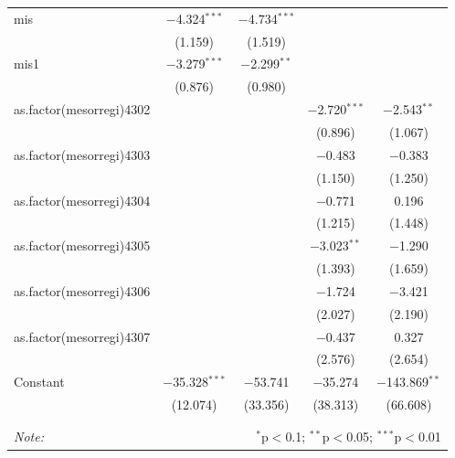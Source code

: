 \documentclass[
  a4paper,
]{article}
\begin{document}
\begin{center}
{\begin{tabular}{@{\extracolsep{3pt}}lcccc}
  mis & $-$4.324$^{***}$ & $-$4.734$^{***}$ &  &  \\ 
  & (1.159) & (1.519) &  &  \\ 
  mis1 & $-$3.279$^{***}$ & $-$2.299$^{**}$ &  &  \\ 
  & (0.876) & (0.980) &  &  \\ 
  as.factor(mesorregi)4302 &  &  & $-$2.720$^{***}$ & $-$2.543$^{**}$ \\ 
  &  &  & (0.896) & (1.067) \\ 
  as.factor(mesorregi)4303 &  &  & $-$0.483 & $-$0.383 \\ 
  &  &  & (1.150) & (1.250) \\ 
  as.factor(mesorregi)4304 &  &  & $-$0.771 & 0.196 \\ 
  &  &  & (1.215) & (1.448) \\ 
  as.factor(mesorregi)4305 &  &  & $-$3.023$^{**}$ & $-$1.290 \\ 
  &  &  & (1.393) & (1.659) \\ 
  as.factor(mesorregi)4306 &  &  & $-$1.724 & $-$3.421 \\ 
  &  &  & (2.027) & (2.190) \\ 
  as.factor(mesorregi)4307 &  &  & $-$0.437 & 0.327 \\ 
  &  &  & (2.576) & (2.654) \\ 
  Constant & $-$35.328$^{***}$ & $-$53.741 & $-$35.274 & $-$143.869$^{**}$ \\ 
  & (12.074) & (33.356) & (38.313) & (66.608) \\ 
 \hline \\[-1.8ex] 
\hline 
\hline \\[-1.8ex] 
\textit{Note:}  & \multicolumn{4}{r}{$^{*}$p$<$0.1; $^{**}$p$<$0.05; $^{***}$p$<$0.01} \\ 
\end{tabular} 
}\end{center}
\end{document}
